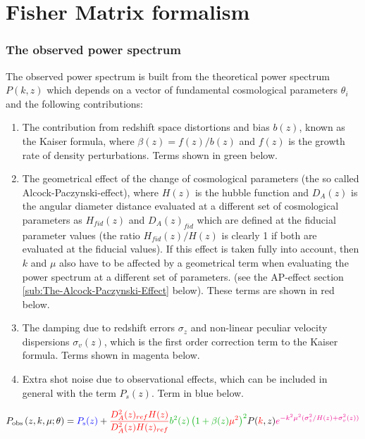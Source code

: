 \section{Fisher Matrix formalism}

\subsubsection{The observed power spectrum}

The observed power spectrum is built from the theoretical power spectrum
$P(k,z)$ which depends on a vector of fundamental cosmological parameters
$\theta_{i}$ and the following contributions:
\begin{enumerate}
\item The contribution from redshift space distortions and bias $b(z)$,
known as the Kaiser formula, where $\beta(z)=f(z)/b(z)$ and $f(z)$
is the growth rate of density perturbations. Terms shown in green
below. 
\item The geometrical effect of the change of cosmological parameters (the
so called Alcock-Paczynski-effect), where $H(z)$ is the hubble function
and $D_{A}(z)$ is the angular diameter distance evaluated at a different
set of cosmological parameters as $H_{fid}(z)$ and $D_{A}(z)_{fid}$
which are defined at the fiducial parameter values (the ratio $H_{fid}(z)/H(z)$
is clearly 1 if both are evaluated at the fiducial values). If this
effect is taken fully into account, then $k$ and $\mu$ also have
to be affected by a geometrical term when evaluating the power spectrum
at a different set of parameters. (see the AP-effect section \ref{sub:The-Alcock-Paczynski-Effect}
below). These terms are shown in red below.
\item The damping due to redshift errors $\sigma_{z}$ and non-linear peculiar
velocity dispersions $\sigma_{v}(z)$, which is the first order correction
term to the Kaiser formula. Terms shown in magenta below. 
\item Extra shot noise due to observational effects, which can be included
in general with the term $P_{s}(z)$. Term in blue below.
\end{enumerate}
\begin{equation}
P_{{\rm obs}}\left(z,k,\mu;\theta\right)=\textcolor{blue}{P_{{\rm s}}(z)}+\textcolor{red}{\frac{D_{A}^{2}(z)_{ref}H(z)}{D_{A}^{2}(z)H(z)_{ref}}}{\color{green}b^{2}(z)\left(1+\beta(z){\color{red}\mu}^{{\color{red}2}}\right)^{2}}P({\color{red}k},z){\color{magenta}e^{-k^{2}\mu^{2}(\sigma_{z}^{2}/H(z)+\sigma_{v}^{2}(z))}}\label{eq:obs-power-basic}
\end{equation}


